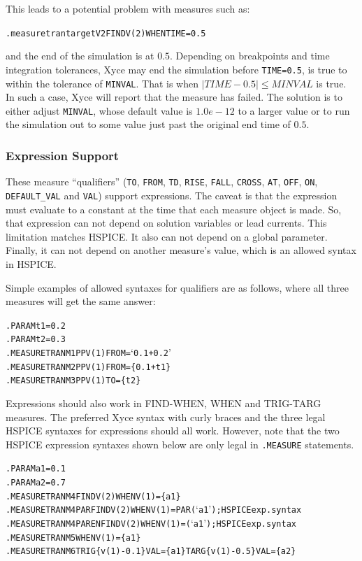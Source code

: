 This leads to a potential problem with measures such as:
\begin{alltt}
.measure tran targetV2 FIND V(2) WHEN TIME=0.5
\end{alltt}
and the end of the simulation is at $0.5$.  Depending on breakpoints and
time integration tolerances, Xyce may end the simulation before 
\texttt{TIME=0.5}, is true to within the tolerance of \texttt{MINVAL}.  That is
when $|TIME-0.5| \leq MINVAL$ is true.  In such 
a case, Xyce will report that the measure has failed.  The solution is to either
adjust \texttt{MINVAL}, whose default value is $1.0e-12$ to a larger value or to run 
the simulation out to some value just past the original end time of $0.5$.

\subsubsection{Expression Support}
These measure ``qualifiers'' (\texttt{TO}, \texttt{FROM}, \texttt{TD},
\texttt{RISE}, \texttt{FALL}, \texttt{CROSS}, \texttt{AT}, \texttt{OFF},
\texttt{ON}, \texttt{DEFAULT\_VAL} and \texttt{VAL}) support expressions.
The caveat is that the expression must evaluate to a constant at the time
that each measure object is made.  So, that expression can not depend
on solution variables or lead currents.  This limitation matches HSPICE.
It also can not depend on a global parameter.  Finally, it can not depend
on another measure's value, which is an allowed syntax in HSPICE.

Simple examples of allowed syntaxes for qualifiers are as follows, where
all three measures will get the same answer:
\begin{alltt}
.PARAM t1=0.2
.PARAM t2=0.3
.MEASURE TRAN M1 PP V(1) FROM=`0.1+0.2'
.MEASURE TRAN M2 PP V(1) FROM=\{0.1+t1\}
.MEASURE TRAN M3 PP V(1) TO=\{t2\}
\end{alltt}
Expressions should also work in FIND-WHEN, WHEN and TRIG-TARG measures. The
preferred Xyce syntax with curly braces and the three legal HSPICE syntaxes
for expressions should all work.  However, note that the two HSPICE
expression syntaxes shown below are only legal in \Xyce{} \texttt{.MEASURE}
statements.
\begin{alltt}
.PARAM a1=0.1
.PARAM a2=0.7
.MEASURE TRAN M4 FIND V(2) WHEN V(1)=\{a1\}
.MEASURE TRAN M4PAR FIND V(2) WHEN V(1)=PAR(`a1') ; HSPICE exp. syntax
.MEASURE TRAN M4PAREN FIND V(2) WHEN V(1)=(`a1')  ; HSPICE exp. syntax
.MEASURE TRAN M5 WHEN V(1)=\{a1\}
.MEASURE TRAN M6 TRIG \{v(1)-0.1\} VAL=\{a1\} TARG \{v(1)-0.5\} VAL=\{a2\}
\end{alltt}

